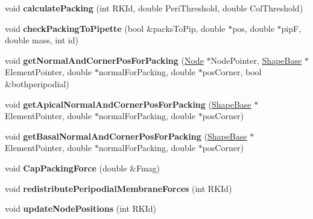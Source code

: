 \begin{DoxyCompactItemize}
\item 
\hypertarget{classSimulation_ab7a42371989ee2ef640dbfb1bfbb21ff}{}void {\bfseries calculate\+Packing} (int R\+K\+Id, double Peri\+Threshold, double Col\+Threshold)\label{classSimulation_ab7a42371989ee2ef640dbfb1bfbb21ff}

\item 
\hypertarget{classSimulation_a4789349db2f4a908064f05e0ee74265d}{}void {\bfseries check\+Packing\+To\+Pipette} (bool \&packs\+To\+Pip, double $\ast$pos, double $\ast$pip\+F, double mass, int id)\label{classSimulation_a4789349db2f4a908064f05e0ee74265d}

\item 
\hypertarget{classSimulation_a93325d2848bfe281bff7c373ad369f86}{}void {\bfseries get\+Normal\+And\+Corner\+Pos\+For\+Packing} (\hyperlink{classNode}{Node} $\ast$Node\+Pointer, \hyperlink{classShapeBase}{Shape\+Base} $\ast$Element\+Pointer, double $\ast$normal\+For\+Packing, double $\ast$pos\+Corner, bool \&bothperipodial)\label{classSimulation_a93325d2848bfe281bff7c373ad369f86}

\item 
\hypertarget{classSimulation_a532ee0b0d6b016b898391fc7188187cc}{}void {\bfseries get\+Apical\+Normal\+And\+Corner\+Pos\+For\+Packing} (\hyperlink{classShapeBase}{Shape\+Base} $\ast$Element\+Pointer, double $\ast$normal\+For\+Packing, double $\ast$pos\+Corner)\label{classSimulation_a532ee0b0d6b016b898391fc7188187cc}

\item 
\hypertarget{classSimulation_a80ed7a37c28be0fd5bdbd097e4b44344}{}void {\bfseries get\+Basal\+Normal\+And\+Corner\+Pos\+For\+Packing} (\hyperlink{classShapeBase}{Shape\+Base} $\ast$Element\+Pointer, double $\ast$normal\+For\+Packing, double $\ast$pos\+Corner)\label{classSimulation_a80ed7a37c28be0fd5bdbd097e4b44344}

\item 
\hypertarget{classSimulation_a33120f358a608cf6ede1a45715a8f990}{}void {\bfseries Cap\+Packing\+Force} (double \&Fmag)\label{classSimulation_a33120f358a608cf6ede1a45715a8f990}

\item 
\hypertarget{classSimulation_a0f2aafedd2ceaab7ef60b9493aa98b21}{}void {\bfseries redistribute\+Peripodial\+Membrane\+Forces} (int R\+K\+Id)\label{classSimulation_a0f2aafedd2ceaab7ef60b9493aa98b21}

\item 
\hypertarget{classSimulation_a90c07716cd9ffe3b4c48babf77eb8904}{}void {\bfseries update\+Node\+Positions} (int R\+K\+Id)\label{classSimulation_a90c07716cd9ffe3b4c48babf77eb8904}


\end{DoxyCompactItemize}
